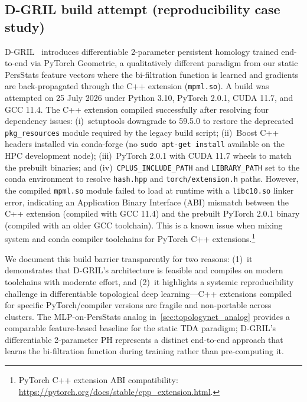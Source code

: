 \documentclass[11pt,a4paper]{article}
\begin{document}
\subsection{D-GRIL build attempt (reproducibility case study)}
\label{sec:dgril_build}

D-GRIL~\citep{dgril_2026} introduces differentiable 2-parameter persistent homology trained end-to-end via PyTorch Geometric, a qualitatively different paradigm from our static PersStats feature vectors where the bi-filtration function is learned and gradients are back-propagated through the C++ extension (\texttt{mpml.so}). A build was attempted on 25 July 2026 under Python 3.10, PyTorch 2.0.1, CUDA 11.7, and GCC 11.4. The C++ extension compiled successfully after resolving four dependency issues: (i)~setuptools downgrade to 59.5.0 to restore the deprecated \texttt{pkg\_resources} module required by the legacy build script; (ii)~Boost C++ headers installed via conda-forge (no \texttt{sudo apt-get install} available on the HPC development node); (iii)~PyTorch 2.0.1 with CUDA 11.7 wheels to match the prebuilt binaries; and (iv)~\texttt{CPLUS\_INCLUDE\_PATH} and \texttt{LIBRARY\_PATH} set to the conda environment to resolve \texttt{hash.hpp} and \texttt{torch/extension.h} paths. However, the compiled \texttt{mpml.so} module failed to load at runtime with a \texttt{libc10.so} linker error, indicating an Application Binary Interface (ABI) mismatch between the C++ extension (compiled with GCC 11.4) and the prebuilt PyTorch 2.0.1 binary (compiled with an older GCC toolchain). This is a known issue when mixing system and conda compiler toolchains for PyTorch C++ extensions.\footnote{PyTorch C++ extension ABI compatibility: \url{https://pytorch.org/docs/stable/cpp_extension.html}.}

We document this build barrier transparently for two reasons: (1)~it demonstrates that D-GRIL's architecture is feasible and compiles on modern toolchains with moderate effort, and (2)~it highlights a systemic reproducibility challenge in differentiable topological deep learning---C++ extensions compiled for specific PyTorch/compiler versions are fragile and non-portable across clusters. The MLP-on-PersStats analog in~\cref{sec:topologynet_analog} provides a comparable feature-based baseline for the static TDA paradigm; D-GRIL's differentiable 2-parameter PH represents a distinct end-to-end approach that learns the bi-filtration function during training rather than pre-computing it.

\end{document}
